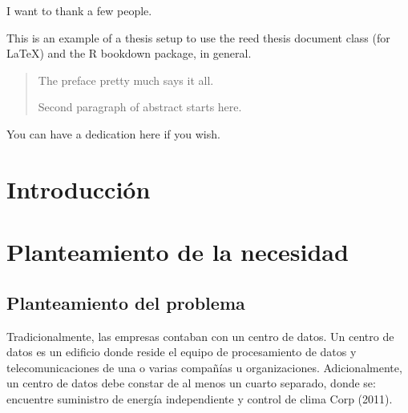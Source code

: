 \documentclass[12pt,twoside]{reedthesis}
\title{}
\author{}
\date{}
\begin{document}

\frontmatter %
\pagestyle{empty} %
  \begin{acknowledgements}
    I want to thank a few people.
  \end{acknowledgements}
  \begin{preface}
    This is an example of a thesis setup to use the reed thesis document class
    (for LaTeX) and the R bookdown package, in general.
  \end{preface}
  \hypersetup{linkcolor=black}
  \setcounter{tocdepth}{2}
  \tableofcontents

  \listoftables

  \listoffigures
  \begin{abstract}
    The preface pretty much says it all.
    
    \par
    
    Second paragraph of abstract starts here.
  \end{abstract}
  \begin{dedication}
    You can have a dedication here if you wish.
  \end{dedication}
\mainmatter %
\pagestyle{fancyplain} %

\hypertarget{introduccion}{%
\chapter*{Introducción}\label{introduccion}}

\hypertarget{rmd-basics}{%
\chapter{Planteamiento de la necesidad}\label{rmd-basics}}

\hypertarget{planteamiento-del-problema}{%
\section{Planteamiento del problema}\label{planteamiento-del-problema}}

Tradicionalmente, las empresas contaban con un centro de datos.
Un centro de datos es un edificio donde reside el equipo de procesamiento de datos y telecomunicaciones de una o varias compañías u organizaciones.
Adicionalmente, un centro de datos debe constar de al menos un cuarto separado, donde se: encuentre suministro de energía independiente y control de clima Corp (2011).
\end{document}

